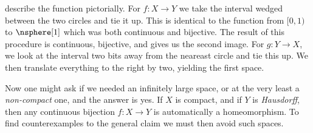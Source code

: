 \documentclass{book}                                                           %
\begin{document}
                describe the function pictorially. For $f:X\rightarrow{Y}$ we
                take the interval wedged between the two circles and tie it up.
                This is identical to the function from $[0,1)$ to $\nsphere[1]$
                which was both continuous and bijective. The result of this
                procedure is continuous, bijective, and gives us the second
                image. For $g:Y\rightarrow{X}$, we look at the interval two bits
                away from the neareast circle and tie this up. We then translate
                everything to the right by two, yielding the first space.
                \par\hfill\par
                Now one might ask if we needed an infinitely large space, or at
                the very least a \textit{non-compact} one, and the answer is
                yes. If $X$ is compact, and if $Y$ is \textit{Hausdorff}, then
                any continuous bijection $f:X\rightarrow{Y}$ is automatically a
                homeomorphism. To find counterexamples to the general claim we
                must then avoid such spaces.
\end{document}
